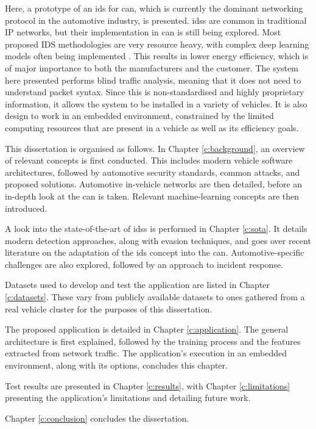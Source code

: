 Here, a prototype of an \gls{ids} for \gls{can}, which is currently the dominant networking protocol in the automotive industry, is presented. \glspl{ids} are common in traditional IP networks, but their implementation in \gls{can} is still being explored. Most proposed IDS methodologies are very resource heavy, with complex deep learning models often being implemented \citep{ahmad2021network}. This results in lower energy efficiency, which is of major importance to both the manufacturers and the customer. The system here presented performs blind traffic analysis, meaning that it does not need to understand packet syntax. Since this is non-standardised and highly proprietary information, it allows the system to be installed in a variety of vehicles. It is also design to work in an embedded environment, constrained by the limited computing resources that are present in a vehicle as well as its efficiency goals.\par

This dissertation is organised as follows. In Chapter \ref{c:background}, an overview of relevant concepts is first conducted. This includes modern vehicle software architectures, followed by automotive security standards, common attacks, and proposed solutions. Automotive in-vehicle networks are then detailed, before an in-depth look at the \acrlong{can} is taken. Relevant machine-learning concepts are then introduced.\par
A look into the state-of-the-art of \glspl{ids} is performed in Chapter \ref{c:sota}. It details modern detection approaches, along with evasion techniques, and goes over recent literature on the adaptation of the \gls{ids} concept into the \acrlong{can}. Automotive-specific challenges are also explored, followed by an approach to incident response.\par
Datasets used to develop and test the application are listed in Chapter \ref{c:datasets}. These vary from publicly available datasets to ones gathered from a real vehicle cluster for the purposes of this dissertation.\par
The proposed application is detailed in Chapter \ref{c:application}. The general architecture is first explained, followed by the training process and the features extracted from network traffic. The application's execution in an embedded environment, along with its options, concludes this chapter.\par
Test results are presented in Chapter \ref{c:results}, with Chapter \ref{c:limitations} presenting the application's limitations and detailing future work.\par
Chapter \ref{c:conclusion} concludes the dissertation.